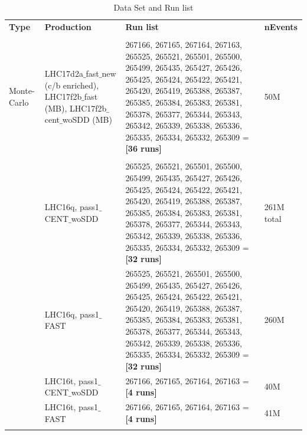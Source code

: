 \begin{table}[h]
\begin{tabular}{ p{1.2cm} | p{4.2cm} |  p{7cm} |  p{1.2cm}}
{\normalsize \textbf {Type}} &       {\normalsize \textbf {Production}} &       {\normalsize \textbf {Run list}} & {\normalsize \textbf {nEvents}} \\
\\ \hline
Monte-Carlo & LHC17d2a$\_$fast$\_$new (c/b enriched), LHC17f2b$\_$fast (MB), LHC17f2b$\_$cent$\_$woSDD (MB) &267166, 267165, 267164, 267163, 265525, 265521, 265501, 265500, 265499, 265435, 265427, 265426, 265425, 265424, 265422, 265421, 265420, 265419, 265388, 265387, 265385, 265384, 265383, 265381, 265378, 265377, 265344, 265343, 265342, 265339, 265338, 265336, 265335, 265334, 265332, 265309 = \textbf{[36 runs]} & 50M\\
\\ \hline

\multirow{7}{*}{} Data&LHC16q, pass1$\_$CENT$\_$woSDD & 265525, 265521, 265501, 265500, 265499, 265435, 265427, 265426, 265425, 265424, 265422, 265421, 265420, 265419, 265388, 265387, 265385, 265384, 265383, 265381, 265378, 265377, 265344, 265343, 265342, 265339, 265338, 265336, 265335, 265334, 265332, 265309 = \textbf{[32 runs]}& 261M total\\
                  &LHC16q, pass1$\_$FAST &265525, 265521, 265501, 265500, 265499, 265435, 265427, 265426, 265425, 265424, 265422, 265421, 265420, 265419, 265388, 265387, 265385, 265384, 265383, 265381, 265378, 265377, 265344, 265343, 265342, 265339, 265338, 265336, 265335, 265334, 265332, 265309 = \textbf{[32 runs]} & 260M \\
 & LHC16t, pass1$\_$CENT$\_$woSDD & 267166, 267165, 267164, 267163 = \textbf{[4 runs]} & 40M \\
  & LHC16t, pass1$\_$FAST & 267166, 267165, 267164, 267163 = \textbf{[4 runs]} & 41M \\
 \hline \hline
\label{tab:Sample}
\end{tabular}
\\
\caption {Data Set and Run list}
\end{table}


